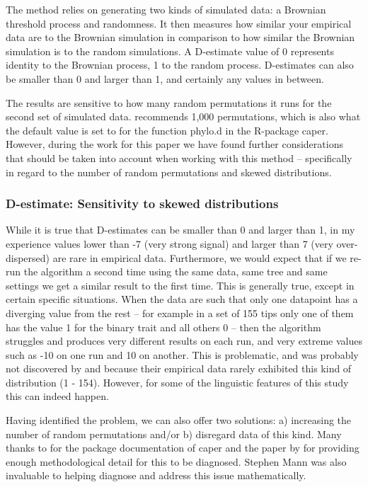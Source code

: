 \documentclass[12pt,letterpaper]{article}
\begin{document}
The method relies on generating two kinds of simulated data: a Brownian threshold process and randomness. It then measures how similar your empirical data are to the Brownian simulation in comparison to how similar the Brownian simulation is to the random simulations. A D-estimate value of 0 represents identity to the Brownian process, 1 to the random process. D-estimates can also be smaller than 0 and larger than 1, and certainly any values in between. 

The results are sensitive to how many random permutations it runs for the second set of simulated data. \cite{fritz2010selectivity} recommends 1,000 permutations, which is also what the default value is set to for the function phylo.d in the R-package caper. However, during the work for this paper we have found further considerations that should be taken into account when working with this method -- specifically in regard to the number of random permutations and skewed distributions.

\subsubsection{D-estimate: Sensitivity to skewed distributions}
\label{sec:SM_phylo_d_sensitive}
While it is true that D-estimates can be smaller than 0 and larger than 1, in my experience values lower than -7 (very strong signal) and larger than 7 (very over-dispersed) are rare in empirical data. Furthermore, we would expect that if we re-run the algorithm a second time using the same data, same tree and same settings we get a similar result to the first time. This is generally true, except in certain specific situations. When the data are such that only one datapoint has a diverging value from the rest -- for example in a set of 155 tips only one of them has the value 1 for the binary trait and all others 0 -- then the algorithm struggles and produces very different results on each run, and very extreme values such as -10 on one run and 10 on another. This is problematic, and was probably not discovered by \cite{fritz2010selectivity} and \cite{orme2013caper} because their empirical data rarely exhibited this kind of distribution (1 - 154). However, for some of the linguistic features of this study this can indeed happen. 

Having identified the problem, we can also offer two solutions: a) increasing the number of random permutations and/or b) disregard data of this kind. Many thanks to \citep{orme2013caper} for the package documentation of caper and the paper by \cite{fritz2010selectivity} for providing enough methodological detail for this to be diagnosed. Stephen Mann was also invaluable to helping diagnose and address this issue mathematically.
\end{document}
